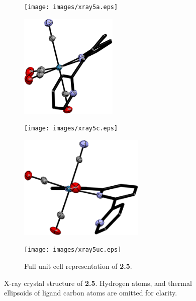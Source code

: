 \begin{figure}[!ht]
 \centering
 \begin{subfigure}[b]{0.49\textwidth}
  \texttt{[image: images/xray5a.eps]}
 \end{subfigure}
 \begin{subfigure}[b]{0.49\textwidth}
  \includegraphics[clip=true, width=\textwidth, height=50mm, keepaspectratio]{images/xray5b.eps}
 \end{subfigure}
 \begin{subfigure}[b]{0.49\textwidth}
  \texttt{[image: images/xray5c.eps]}
 \end{subfigure}
 \begin{subfigure}[b]{0.49\textwidth}
  \includegraphics[clip=true, width=\textwidth, height=50mm, keepaspectratio]{images/xray5d.eps}
 \end{subfigure}
 \begin{subfigure}[b]{\textwidth}
  \centering
  \texttt{[image: images/xray5uc.eps]}
  \caption{Full unit cell representation of \textbf{2.5}.}
 \end{subfigure}
\caption[X-ray crystal structure of \textbf{2.5}.]{X-ray crystal structure of \textbf{2.5}. Hydrogen atoms, and thermal ellipsoids of ligand carbon atoms are omitted for clarity.}
\label{fig.xray25}
\end{figure}


